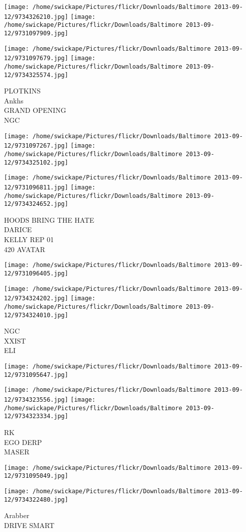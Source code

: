 \documentclass[10pt,letterpaper]{article}
\begin{document}
\texttt{[image: /home/swickape/Pictures/flickr/Downloads/Baltimore 2013-09-12/9734326210.jpg]}
\texttt{[image: /home/swickape/Pictures/flickr/Downloads/Baltimore 2013-09-12/9731097909.jpg]}

\texttt{[image: /home/swickape/Pictures/flickr/Downloads/Baltimore 2013-09-12/9731097679.jpg]}
\texttt{[image: /home/swickape/Pictures/flickr/Downloads/Baltimore 2013-09-12/9734325574.jpg]}

PLOTKINS\\
Ankhs\\
GRAND OPENING\\
NGC
\pagebreak

\texttt{[image: /home/swickape/Pictures/flickr/Downloads/Baltimore 2013-09-12/9731097267.jpg]}
\texttt{[image: /home/swickape/Pictures/flickr/Downloads/Baltimore 2013-09-12/9734325102.jpg]}

\texttt{[image: /home/swickape/Pictures/flickr/Downloads/Baltimore 2013-09-12/9731096811.jpg]}
\texttt{[image: /home/swickape/Pictures/flickr/Downloads/Baltimore 2013-09-12/9734324652.jpg]}

HOODS BRING THE HATE\\
DARICE\\
KELLY REP 01\\
420 AVATAR
\pagebreak

\texttt{[image: /home/swickape/Pictures/flickr/Downloads/Baltimore 2013-09-12/9731096405.jpg]}

\vspace{0.25in}
\texttt{[image: /home/swickape/Pictures/flickr/Downloads/Baltimore 2013-09-12/9734324202.jpg]}
\texttt{[image: /home/swickape/Pictures/flickr/Downloads/Baltimore 2013-09-12/9734324010.jpg]}

NGC\\
XXIST\\
ELI
\pagebreak

\texttt{[image: /home/swickape/Pictures/flickr/Downloads/Baltimore 2013-09-12/9731095647.jpg]}

\vspace{0.25in}
\texttt{[image: /home/swickape/Pictures/flickr/Downloads/Baltimore 2013-09-12/9734323556.jpg]}
\texttt{[image: /home/swickape/Pictures/flickr/Downloads/Baltimore 2013-09-12/9734323334.jpg]}

RK\\
EGO DERP\\
MASER
\pagebreak

\texttt{[image: /home/swickape/Pictures/flickr/Downloads/Baltimore 2013-09-12/9731095049.jpg]}

\vspace{0.25in}
\texttt{[image: /home/swickape/Pictures/flickr/Downloads/Baltimore 2013-09-12/9734322480.jpg]}

Arabber\\
DRIVE SMART
\pagebreak
\end{document}

